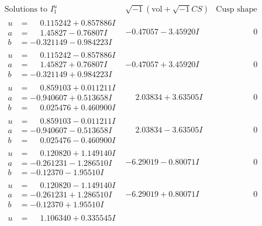 \documentclass[1p]{elsarticle_modified}
\theoremstyle{definition}
\newcommand{\I}{\sqrt{-1}}
\begin{document}
$$\begin{array}{c|c|c}
\text{Solutions to }I^u_{1}& \I (\text{vol} + \sqrt{-1}CS) & \text{Cusp shape}\\
 \hline 
\begin{aligned}
u &= \phantom{-}0.115242 + 0.857886 I \\
a &= \phantom{-}1.45827 - 0.76807 I \\
b &= -0.321149 - 0.984223 I\end{aligned}
 & -0.47057 - 3.45920 I & \phantom{-0.000000 } 0 \\ \hline\begin{aligned}
u &= \phantom{-}0.115242 - 0.857886 I \\
a &= \phantom{-}1.45827 + 0.76807 I \\
b &= -0.321149 + 0.984223 I\end{aligned}
 & -0.47057 + 3.45920 I & \phantom{-0.000000 } 0 \\ \hline\begin{aligned}
u &= \phantom{-}0.859103 + 0.011211 I \\
a &= -0.940607 + 0.513658 I \\
b &= \phantom{-}0.025476 + 0.460900 I\end{aligned}
 & \phantom{-}2.03834 + 3.63505 I & \phantom{-0.000000 } 0 \\ \hline\begin{aligned}
u &= \phantom{-}0.859103 - 0.011211 I \\
a &= -0.940607 - 0.513658 I \\
b &= \phantom{-}0.025476 - 0.460900 I\end{aligned}
 & \phantom{-}2.03834 - 3.63505 I & \phantom{-0.000000 } 0 \\ \hline\begin{aligned}
u &= \phantom{-}0.120820 + 1.149140 I \\
a &= -0.261231 - 1.286510 I \\
b &= -0.12370 - 1.95510 I\end{aligned}
 & -6.29019 - 0.80071 I & \phantom{-0.000000 } 0 \\ \hline\begin{aligned}
u &= \phantom{-}0.120820 - 1.149140 I \\
a &= -0.261231 + 1.286510 I \\
b &= -0.12370 + 1.95510 I\end{aligned}
 & -6.29019 + 0.80071 I & \phantom{-0.000000 } 0 \\ \hline\begin{aligned}
u &= \phantom{-}1.106340 + 0.335545 I \\

\end{aligned}
\end{array}$$
\end{document}

